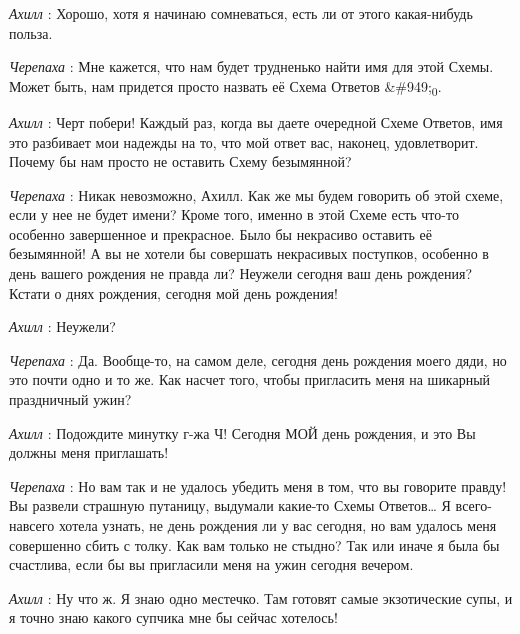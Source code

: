 \documentclass[../main.tex]{subfiles}
\begin{document}
\begin{dialogue}
\emph{Ахилл} : Хорошо, хотя я начинаю сомневаться, есть ли от этого какая-нибудь польза.

\emph{Черепаха} : Мне кажется, что нам будет трудненько найти имя для этой Схемы. Может быть, нам придется просто назвать её Схема Ответов \&\#949;\textsubscript{0}.

\emph{Ахилл} : Черт побери! Каждый раз, когда вы даете очередной Схеме Ответов, имя это разбивает мои надежды на то, что мой ответ вас, наконец, удовлетворит. Почему бы нам просто не оставить Схему безымянной?

\emph{Черепаха} : Никак невозможно, Ахилл. Как же мы будем говорить об этой схеме, если у нее не будет имени? Кроме того, именно в этой Схеме есть что-то особенно завершенное и прекрасное. Было бы некрасиво оставить её безымянной! А вы не хотели бы совершать некрасивых поступков, особенно в день вашего рождения не правда ли? Неужели сегодня ваш день рождения? Кстати о днях рождения, сегодня мой день рождения!

\emph{Ахилл} : Неужели?

\emph{Черепаха} : Да. Вообще-то, на самом деле, сегодня день рождения моего дяди, но это почти одно и то же. Как насчет того, чтобы пригласить меня на шикарный праздничный ужин?

\emph{Ахилл} : Подождите минутку г-жа Ч! Сегодня МОЙ день рождения, и это Вы должны меня приглашать!

\emph{Черепаха} : Но вам так и не удалось убедить меня в том, что вы говорите правду! Вы развели страшную путаницу, выдумали какие-то Схемы Ответов\ldots{} Я всего-навсего хотела узнать, не день рождения ли у вас сегодня, но вам удалось меня совершенно сбить с толку. Как вам только не стыдно? Так или иначе я была бы счастлива, если бы вы пригласили меня на ужин сегодня вечером.

\emph{Ахилл} : Ну что ж. Я знаю одно местечко. Там готовят самые экзотические супы, и я точно знаю какого супчика мне бы сейчас хотелось!

\end{dialogue}
\end{document}
